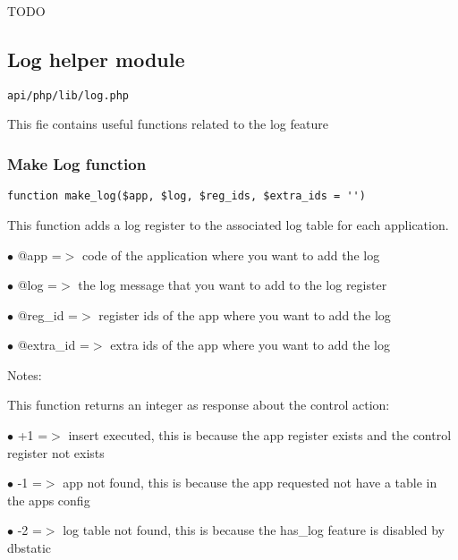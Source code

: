 \documentclass[a4paper]{article}
\begin{document}
TODO

\hypertarget{toc488}{}
\subsection{Log helper module}

\begin{lstlisting}
api/php/lib/log.php
\end{lstlisting}

This fie contains useful functions related to the log feature

\hypertarget{toc489}{}
\subsubsection{Make Log function}

\begin{lstlisting}
function make_log($app, $log, $reg_ids, $extra_ids = '')
\end{lstlisting}

This function adds a log register to the associated log table for each
application.

\begin{compactitem}
\item[\color{myblue}$\bullet$] @app      =$>$ code of the application where you want to add the log
\item[\color{myblue}$\bullet$] @log      =$>$ the log message that you want to add to the log register
\item[\color{myblue}$\bullet$] @reg\_id   =$>$ register ids of the app where you want to add the log
\item[\color{myblue}$\bullet$] @extra\_id =$>$ extra ids of the app where you want to add the log
\end{compactitem}

Notes:

This function returns an integer as response about the control action:

\begin{compactitem}
\item[\color{myblue}$\bullet$] +1 =$>$ insert executed, this is because the app register exists and the control register not exists
\item[\color{myblue}$\bullet$] -1 =$>$ app not found, this is because the app requested not have a table in the apps config
\item[\color{myblue}$\bullet$] -2 =$>$ log table not found, this is because the has\_log feature is disabled by dbstatic
\end{compactitem}
\end{document}
